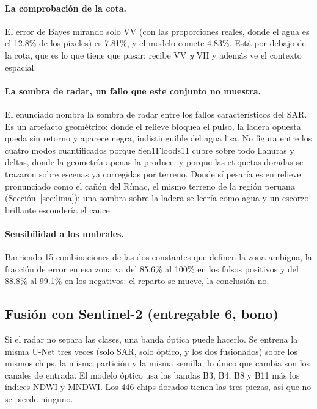 \documentclass{article}
\begin{document}
\paragraph{La comprobación de la cota.}
El error de Bayes mirando solo VV (con las proporciones reales, donde el
agua es el 12.8\% de los píxeles) es 7.81\%, y el modelo comete 4.83\%.
Está por debajo de la cota, que es lo que tiene que pasar: recibe VV \emph{y} VH
y además ve el contexto espacial.

\paragraph{La sombra de radar, un fallo que este conjunto no muestra.}
El enunciado nombra la sombra de radar entre los fallos característicos del SAR.
Es un artefacto geométrico: donde el relieve bloquea el pulso, la ladera opuesta
queda sin retorno y aparece negra, indistinguible del agua lisa. No figura entre
los cuatro modos cuantificados porque Sen1Floods11 cubre sobre todo llanuras y
deltas, donde la geometría apenas la produce, y porque las etiquetas doradas se
trazaron sobre escenas ya corregidas por terreno. Donde sí pesaría es en relieve
pronunciado como el cañón del Rímac, el mismo terreno de la región peruana
(Sección~\ref{sec:lima}): una sombra sobre la ladera se leería como agua y un
escorzo brillante escondería el cauce.

\paragraph{Sensibilidad a los umbrales.}
Barriendo 15 combinaciones de las dos constantes que definen la zona ambigua, la
fracción de error en esa zona va del 85.6\% al 100\% en los falsos positivos y
del 88.8\% al 99.1\% en los negativos: el reparto se mueve, la conclusión no.

\subsection{Fusión con Sentinel-2 (entregable 6, bono)}
\label{sec:fusion}

Si el radar no separa las clases, una banda óptica puede hacerlo.
Se entrena la misma U-Net tres veces (solo SAR, solo óptico, y los dos
fusionados) sobre los mismos chips, la misma partición y la misma semilla; lo
único que cambia son los canales de entrada. El modelo óptico usa las bandas B3,
B4, B8 y B11 más los índices NDWI y MNDWI. Los 446 chips dorados tienen las
tres piezas, así que no se pierde ninguno.
\end{document}
